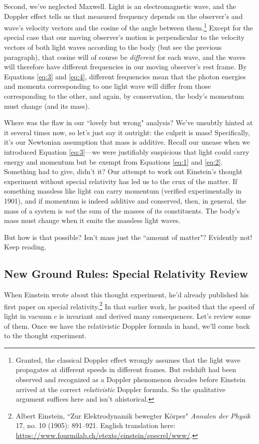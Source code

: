 \documentclass[12pt]{article}
\begin{document}
Second, we've neglected Maxwell. Light is an electromagnetic wave, and the Doppler effect tells us that measured frequency depends on the observer's and wave's velocity vectors and the cosine of the angle between them.\footnote{Granted, the classical Doppler effect wrongly assumes that the light wave propagates at different speeds in different frames. But redshift had been observed and recognized as a Doppler phenomenon decades before Einstein arrived at the correct \emph{relativistic} Doppler formula. So the qualitative argument suffices here and isn't ahistorical.} Except for the special case that our moving observer's motion is perpendicular to the velocity vectors of both light waves according to the body (but see the previous paragraph), that cosine will of course be \emph{different} for each wave, and the waves will therefore have different frequencies in our moving observer's rest frame. By Equations \ref{eq:3} and \ref{eq:4}, different frequencies mean that the photon energies and momenta corresponding to one light wave will differ from those corresponding to the other, and again, by conservation, the body's momentum must change (and its mass\textinterrobang).

Where was the flaw in our ``lovely but wrong" analysis? We've unsubtly hinted at it several times now, so let's just say it outright: the culprit is mass! Specifically, it's our Newtonian assumption that mass is additive. Recall our unease when we introduced Equation \ref{eq:3}---we were justifiably suspicious that light could carry energy and momentum but be exempt from Equations \ref{eq:1} and \ref{eq:2}. Something had to give, didn't it? Our attempt to work out Einstein's thought experiment without special relativity has led us to the crux of the matter. If something massless like light can carry momentum (verified experimentally in 1901), and if momentum is indeed additive and conserved, then, in general, the mass of a system is \emph{not} the sum of the masses of its constituents. The body's mass must change when it emits the massless light waves.

But how is that possible? Isn't mass just the ``amount of matter"? Evidently not! Keep reading.



\subsection{New Ground Rules: Special Relativity Review}\label{ssec:sr}

When Einstein wrote about this thought experiment, he'd already published his first paper on special relativity.\footnote{\label{fn:ep}Albert Einstein, ``Zur Elektrodynamik bewegter K\"orper" \emph{Annalen der Physik} 17, no. 10 (1905): 891--921. English translation here: \url{https://www.fourmilab.ch/etexts/einstein/specrel/www/}.} In that earlier work, he posited that the speed of light in vacuum $c$ is invariant and derived many consequences. Let's review some of them. Once we have the relativistic Doppler formula in hand, we'll come back to the thought experiment.
\end{document}
